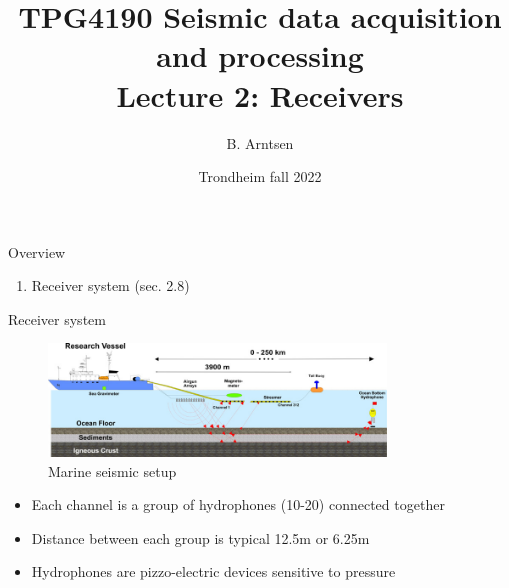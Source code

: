 \documentclass[xcolor=dvipsnames,notes]{beamer}
\begin{document}
\title{TPG4190 Seismic data acquisition and processing \\
               Lecture 2: Receivers}
\author{B. Arntsen}
\date{Trondheim fall 2022}
\begin{frame}
 \titlepage
\end{frame}
\begin{frame}{Overview}
\begin{enumerate}
  \item Receiver system (sec. 2.8) 
\end{enumerate}
\end{frame}
\begin{frame}{Receiver system}
\begin{figure}
  \includegraphics[width=0.8\textwidth]{Fig/seismic-ship.jpg}
  \caption{Marine seismic setup}
  \label{fig:ship}
\end{figure}
\begin{itemize}
\item Each channel is a group of hydrophones
      (10-20) connected together
\item Distance between each group is typical 12.5m or 6.25m
\item Hydrophones are pizzo-electric devices sensitive to pressure
\end{itemize}
\end{frame}
\end{document}
